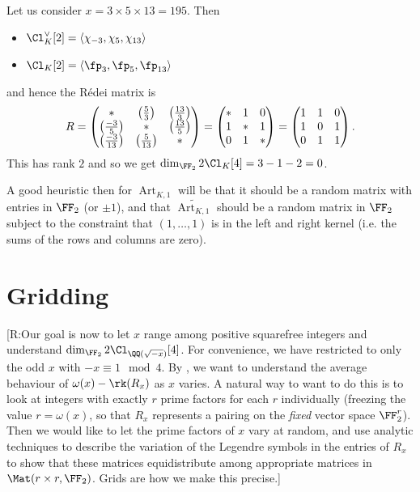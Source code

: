 \documentclass{lecturenotes}
\newcommand{\ross}[1]{{\color{red}[R:#1]}}
\newcommand{\Art}{\operatorname{Art}}
\numberwithin{equation}{section}
\begin{document}
\begin{example}
    Let us consider $x=3\times 5\times 13=195$.  Then
    \begin{itemize}
        \item $\Cl_K^\vee[2]=\gp{\chi_{-3},\chi_{5},\chi_{13}}$
        \item $\Cl_K[2]=\gp{\fp_3,\fp_5,\fp_{13}}$ 
    \end{itemize}
    and hence the R\'edei matrix is
    \[R=\begin{pmatrix}
        *&\left(\frac{5}{3}\right)&\left(\frac{13}{3}\right)\\
        \left(\frac{-3}{5}\right)&*&\left(\frac{13}{5}\right)\\
        \left(\frac{-3}{13}\right)&\left(\frac{5}{13}\right)&*
    \end{pmatrix}=\begin{pmatrix}
        *&1&0\\
        1&*&1\\
        0&1&*
    \end{pmatrix}=\begin{pmatrix}
        1&1&0\\
        1&0&1\\
        0&1&1
    \end{pmatrix}.\]
    This has rank $2$ and so we get $\dim_{\FF_2} 2\Cl_K[4]=3-1-2=0$.
\end{example}

\newpage\lecture{}{}
A good heuristic then for $\Art_{K,1}$ will be that it should be a random matrix with entries in $\FF_2$ (or $\pm 1$), and that $\widetilde{\Art_{K,1}}$ should be a random matrix in $\FF_2$ subject to the constraint that $(1,\dots,1)$ is in the left and right kernel (i.e. the sums of the rows and columns are zero).

\section{Gridding}
\ross{Our goal is now to let $x$ range among positive squarefree integers and understand $\dim_{\FF_2}2\Cl_{\QQ(\sqrt{-x})}[4]$.  For convenience, we have restricted to only the odd $x$ with $-x\equiv 1\mod 4$.  By \Cref{thm:4torsRedeiKernel}, we want to understand the average behaviour of $\omega(x)-\rk(R_x)$ as $x$ varies.  A natural way to want to do this is to look at integers with exactly $r$ prime factors for each $r$ individually (freezing the value $r=\omega(x)$, so that $R_x$ represents a pairing on the \emph{fixed} vector space $\FF_2^r$).  Then we would like to let the prime factors of $x$ vary at random, and use analytic techniques to describe the variation of the Legendre symbols in the entries of $R_x$ to show that these matrices equidistribute among appropriate matrices in $\Mat(r\times r, \FF_2)$.  Grids are how we make this precise.}
\end{document}
